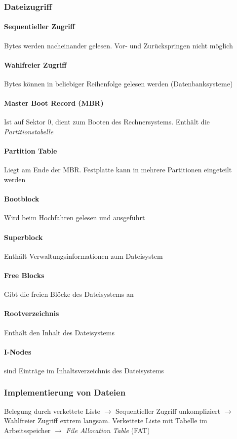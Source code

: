 \documentclass[11pt,a4paper,landscape]{article}
\begin{document}
\begin{multicols*}{3}
	\subsubsection{Dateizugriff}
	\paragraph{Sequentieller Zugriff} Bytes werden nacheinander gelesen. Vor- und Zurückspringen nicht möglich
	\paragraph{Wahlfreier Zugriff} Bytes können in beliebiger Reihenfolge gelesen werden (Datenbanksysteme)
	\paragraph{Master Boot Record (MBR)} Ist auf Sektor 0, dient zum Booten des Rechnersystems. Enthält die \textit{Partitionstabelle}
	\paragraph{Partition Table} Liegt am Ende der MBR. Festplatte kann in mehrere Partitionen eingeteilt werden
	\paragraph{Bootblock} Wird beim Hochfahren gelesen und ausgeführt
	\paragraph{Superblock} Enthält Verwaltungsinformationen zum Dateisystem
	\paragraph{Free Blocks} Gibt die freien Blöcke des Dateisystems an
	\paragraph{Rootverzeichnis} Enthält den Inhalt des Dateisystems
	\paragraph{I-Nodes} sind Einträge im Inhaltsverzeichnis des Dateisystems
	\subsubsection{Implementierung von Dateien}
	Belegung durch verkettete Liste $\rightarrow$ Sequentieller Zugriff unkompliziert $\rightarrow$ Wahlfreier Zugriff extrem langsam. Verkettete Liste mit Tabelle im Arbeitsspeicher $\rightarrow$ \textit{File Allocation Table} (FAT)

\end{multicols*}
\end{document}
